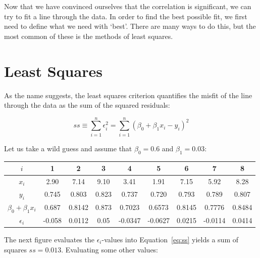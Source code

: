 Now that we have convinced ourselves that the correlation is
significant, we can try to fit a line through the data. In order to
find the best possible fit, we first need to define what we need with
`best'. There are many ways to do this, but the most common of these
is the methods of least squares.

\section{Least Squares}
\label{sec:leastsquares}

As the name suggests, the least squares criterion quantifies the
misfit of the line through the data as the sum of the squared
residuals:

\begin{equation}
ss \equiv \sum_{i=1}^{n} \epsilon_i^2 = \sum_{i=1}^{n} (\beta_0 + \beta_1 x_i - y_i)^2
\label{eq:ss}
\end{equation}

Let us take a wild guess and assume that $\beta_0=0.6$ and
$\beta_1=0.03$:

\begin{center}
  \begin{tabular}{c|cccccccc}
    $i$ & 1 & 2 & 3 & 4 & 5 & 6 & 7 & 8 \\ \hline
    $x_i$ & 2.90 & 7.14 & 9.10 & 3.41 & 1.91 & 7.15 & 5.92 & 8.28 \\
    $y_i$ & 0.745 & 0.803 & 0.823 & 0.737 & 0.720 & 0.793 & 0.789 & 0.807 \\ \hline
    $\beta_0 + \beta_1 x_i$ & 0.687 & 0.8142 & 0.873 & 0.7023 &
    0.6573 & 0.8145 & 0.7776 & 0.8484 \\
    $\epsilon_i$ & -0.058 & 0.0112 & 0.05 & -0.0347 & -0.0627 &
    0.0215 & -0.0114 & 0.0414
  \end{tabular}
\end{center}

The next figure evaluates the $\epsilon_i$-values into
Equation~\ref{eq:ss} yields a sum of squares $ss=0.013$. Evaluating
some other values:

